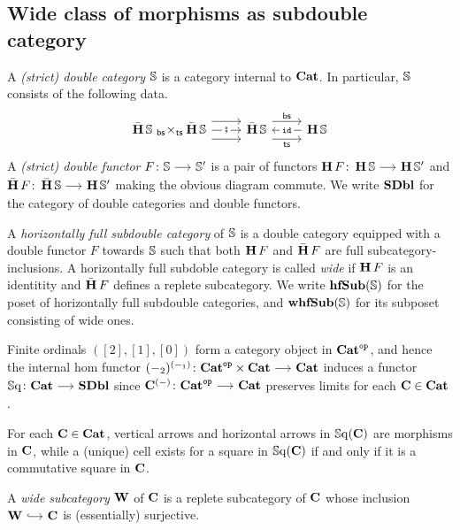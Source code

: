 \documentclass[a4paper,dvipsnames, 11pt]{amsart} %
\begin{document}
\subsection{Wide class of morphisms as subdouble category}
\begin{definition}
	A \emph{(strict) double category} $\mathbb{S}$ is a category internal to ${\mathbf{Cat}}$.
	In particular, $\mathbb{S}$ consists of the following data.
	\[
		\begin{tikzcd}
			\HcatC\dS
			\fibtimes{\bs}{\ts}
			\HcatC\dS
			\ar[r,shift left=3]
			\ar[r,"\fatsemi"description]
			\ar[r,shift right=3]
				&
				\HcatC\dS
				\ar[r,shift left=3,"\bs"]
				\ar[r,shift right=3,"\ts"']
					&
					\Hcat\dS
					\ar[l,"\id"description]
		\end{tikzcd}
	\]
	A \emph{(strict) double functor} $F\colon \dS\arr \dS'$ is a pair of functors
	$\Hcat F\colon\Hcat\dS\arr\Hcat\dS'$ and $\HcatC F\colon\HcatC\dS\arr\Hcat\dS'$ making the obvious diagram commute.
	We write $\mathbf{SDbl}$ for the category of double categories and double functors.

	A \emph{horizontally full subdouble category} of $\mathbb{S}$ is a double category equipped with a double functor $F$ towards $\mathbb{S}$
	such that both $\operatorname{\mathbf{H}} F$ and $\operatorname{\bar{\mathbf{H}}} F$ are full subcategory-inclusions.
	A horizontally full subdoble category is called \emph{wide} if $\operatorname{\mathbf{H}} F$ is an identitity and
	$\operatorname{\bar{\mathbf{H}}} F$ defines a replete subcategory.
	We write $\operatorname{\mathbf{hfSub}}(\mathbb{S})$ for the poset of horizontally full subdouble categories, and $\operatorname{\mathbf{whfSub}}(\mathbb{S})$ for its subposet consisting of wide ones.
\end{definition}
\begin{example}
	Finite ordinals $([2],[1],[0])$ form a category object in ${\mathbf{Cat}}^{\mathtt{op}}$,
	and hence the internal hom functor $(-_2)^{(-_1)}\colon\Catone^\op\times\Catone\arr\Catone$ induces a functor
	$\Sq\colon\Catone\arr\SDbl$ since $\one{C}^{(-)}\colon\Catone^\op\arr\Catone$ preserves limits for each $\mathbf{C}\in{\mathbf{Cat}}$.

	For each $\mathbf{C}\in{\mathbf{Cat}}$, vertical arrows and horizontal arrows
	in $\operatorname{\mathbb{S}\mathrm{q}}(\mathbf{C})$ are morphisms in $\mathbf{C}$, while a (unique) cell exists for a square in $\operatorname{\mathbb{S}\mathrm{q}}(\mathbf{C})$
	if and only if it is a commutative square in $\mathbf{C}$.
\end{example}
\begin{definition}
	A \emph{wide subcategory} $\mathbf{W}$ of $\mathbf{C}$ is a replete subcategory of $\mathbf{C}$ whose inclusion $\one{W}\arr[hook]\one{C}$
	is (essentially) surjective.
\end{definition}
\end{document}

